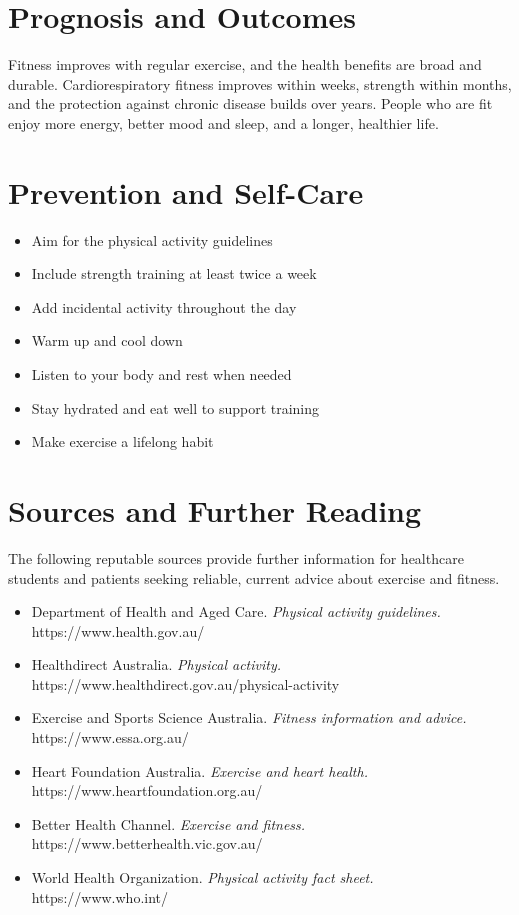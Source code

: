 \section*{Prognosis and Outcomes}
Fitness improves with regular exercise, and the health benefits are broad and durable. Cardiorespiratory fitness improves within weeks, strength within months, and the protection against chronic disease builds over years. People who are fit enjoy more energy, better mood and sleep, and a longer, healthier life.

\section*{Prevention and Self-Care}
\begin{itemize}
    \item Aim for the physical activity guidelines
    \item Include strength training at least twice a week
    \item Add incidental activity throughout the day
    \item Warm up and cool down
    \item Listen to your body and rest when needed
    \item Stay hydrated and eat well to support training
    \item Make exercise a lifelong habit
\end{itemize}

\section*{Sources and Further Reading}
The following reputable sources provide further information for healthcare students and patients seeking reliable, current advice about exercise and fitness.
\begin{itemize}
    \item Department of Health and Aged Care. \textit{Physical activity guidelines.} https://www.health.gov.au/
    \item Healthdirect Australia. \textit{Physical activity.} https://www.healthdirect.gov.au/physical-activity
    \item Exercise and Sports Science Australia. \textit{Fitness information and advice.} https://www.essa.org.au/
    \item Heart Foundation Australia. \textit{Exercise and heart health.} https://www.heartfoundation.org.au/
    \item Better Health Channel. \textit{Exercise and fitness.} https://www.betterhealth.vic.gov.au/
    \item World Health Organization. \textit{Physical activity fact sheet.} https://www.who.int/
\end{itemize}
